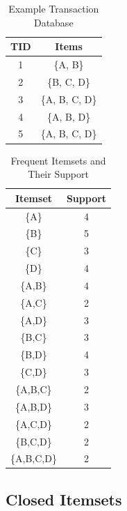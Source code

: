 \begin{paracol}{2}
   \colfill
\begin{table}[H]
   \centering
   \begin{tabular}{|c|c|}
      \hline
      TID & Items \\
      \hline
      1   & \{A, B\}         \\
      2   & \{B, C, D\}            \\
      3   & \{A, B, C, D\}            \\
      4   & \{A, B, D\}         \\
      5   & \{A, B, C, D\}            \\
      \hline
   \end{tabular}
   \caption{Example Transaction Database}
   \label{tab:08/exampleTransactionDB}
\end{table}
   \colfill

\switchcolumn

\begin{table}[H]
   \centering
   \begin{tabular}{|c|c|}
      \hline
      Itemset & Support \\
      \hline
      \{A\} & 4 \\
      \{B\} & 5 \\
      \{C\} & 3 \\
      \{D\} & 4 \\
      \{A,B\} & 4 \\
      \{A,C\} & 2 \\
      \{A,D\} & 3 \\
      \{B,C\} & 3 \\
      \{B,D\} & 4 \\
      \{C,D\} & 3 \\
      \{A,B,C\} & 2 \\
      \{A,B,D\} & 3 \\
      \{A,C,D\} & 2 \\
      \{B,C,D\} & 2 \\
      \{A,B,C,D\} & 2 \\
      \hline
   \end{tabular}
   \caption{Frequent Itemsets and Their Support}
   \label{tab:08/frequent_itemsets}
\end{table}
\end{paracol}

\subsection{Closed Itemsets}

